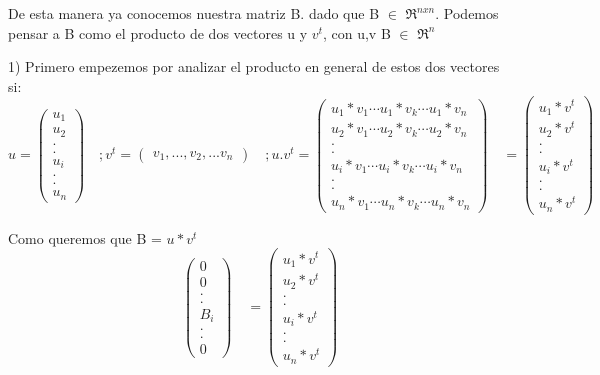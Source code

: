 \documentclass[a4paper]{article}
\begin{document}
De esta manera ya conocemos nuestra matriz B. dado que B $\in$ $\Re^{nxn}$. Podemos pensar a B como el producto de dos vectores u y $v^t$, con u,v B $\in$ $\Re^{n}$
  

1) Primero empezemos por analizar el producto en general de estos dos vectores si: 
$$
u=
\begin{pmatrix} 
u_1\\
u_2\\
.\\
.\\
u_i\\
.\\
.\\
u_n
\end{pmatrix}
\quad
 ;v^t=
\begin{pmatrix} 
v_1,...,v_2,...v_n
\end{pmatrix}
\quad
;u.v^t=
\begin{pmatrix} 
u_1*v_1 \cdots u_1*v_k \cdots u_1*v_n\\
u_2*v_1 \cdots u_2*v_k  \cdots u_2*v_n\\
.\\
.\\
u_i*v_1 \cdots u_i*v_k \cdots u_i*v_n\\
.\\
.\\
u_n*v_1 \cdots u_n*v_k  \cdots u_n*v_n
\end{pmatrix}
\quad
=
\begin{pmatrix} 
u_1*v^t\\
u_2*v^t\\
.\\
.\\
u_i*v^t\\
.\\
.\\
u_n*v^t
\end{pmatrix}
$$

Como queremos que B = $u*v^t$
$$
\begin{pmatrix} 
0\\
0\\
.\\
.\\
B_i\\
.\\
.\\
0
\end{pmatrix}
\quad
=
\begin{pmatrix} 
u_1*v^t\\
u_2*v^t\\
.\\
.\\
u_i*v^t\\
.\\
.\\
u_n*v^t
\end{pmatrix}
$$
\end{document}
